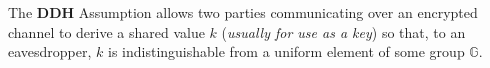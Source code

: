 \documentclass[../CryptoHW3.tex]{subfiles}
\begin{document}
\begin{flushleft}



 The \textbf{DDH} Assumption allows two parties communicating over an encrypted channel to derive a shared value $k$ (\emph{usually for use as a key}) so that, to an eavesdropper, $k$ is indistinguishable from a uniform element of some group $\mathbb{G}$.



























\end{flushleft}
\end{document}
